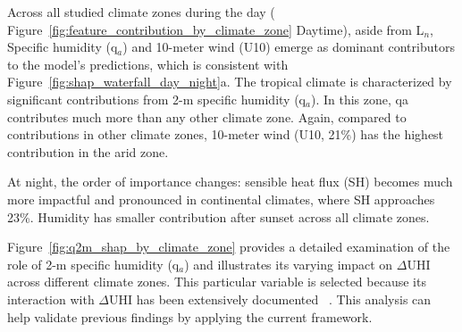 Across all studied climate zones during the day ( Figure~\ref{fig:feature_contribution_by_climate_zone} Daytime), aside from L\ensuremath{_{n}}, Specific humidity (q\ensuremath{_{a}}) and 10-meter wind (U10) emerge as dominant contributors to the model's predictions, which is consistent with Figure~\ref{fig:shap_waterfall_day_night}a. The tropical climate is characterized by significant contributions from 2-m specific humidity (q\ensuremath{_{a}}). In this zone, qa contributes much more than any other climate zone. Again, compared to contributions in other climate zones, 10-meter wind (U10, 21\%) has the highest contribution in the arid zone.

At night, the order of importance changes: sensible heat flux (SH) becomes much more impactful and pronounced in continental climates, where SH approaches 23\%. Humidity has smaller contribution after sunset across all climate zones.


\bgroup
{}
\begin{figure*}[!htbp]
\centering \makeatletter{}
\makeatother 
\caption{{\textbf{Percentage Contribution of Feature Groups to Predicted \ensuremath{\Delta }UHI, Stratified by K{\"{o}}ppen-Geiger Climate Zones.} Bar chart illustrating the percentage contribution of each feature group to the predicted \ensuremath{\Delta }UHI difference, categorized by K{\"{o}}ppen-Geiger climate zones (Arid, Continental, Temperate, and Tropical). Percentage contributions are derived from aggregated SHAP values, indicating the relative importance of each feature group in driving \ensuremath{\Delta }UHI within each climate region.}}
\label{fig:feature_contribution_by_climate_zone}
\end{figure*}
\egroup
Figure~\ref{fig:q2m_shap_by_climate_zone}   provides a detailed examination of the role of 2-m specific humidity (q\ensuremath{_{a}}) and illustrates its varying impact on \ensuremath{\Delta }UHI across different climate zones. This particular variable is selected because its interaction with \ensuremath{\Delta }UHI has been extensively documented\unskip~\cite{2755510:33598930,2755510:33598952,2755510:33598945,2755510:33598947} . This analysis can help validate previous findings by applying the current framework. 

